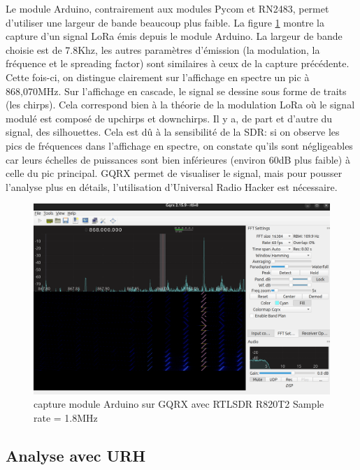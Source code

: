 Le module Arduino, contrairement aux modules Pycom et RN2483, permet d'utiliser une largeur de bande beaucoup plus faible. La figure \ref{term302} montre la capture d'un signal \ac{LoRa} émis depuis le module Arduino. La largeur de bande choisie est de 7.8Khz, les autres paramètres d'émission (la modulation, la fréquence et le spreading factor) sont similaires à ceux de la capture précédente. Cette fois-ci, on distingue clairement sur l'affichage en spectre un pic à 868,070MHz. Sur l'affichage en cascade, le signal se dessine sous forme de traits (les chirps). Cela correspond bien à la théorie de la modulation \ac{LoRa} où le signal modulé est composé de upchirps et downchirps. Il y a, de part et d'autre du signal, des silhouettes. Cela est dû à la sensibilité de la \ac{SDR}: si on observe les pics de fréquences dans l'affichage en spectre, on constate qu'ils sont négligeables car leurs échelles de puissances sont bien inférieures (environ 60dB plus faible) à celle du pic principal. GQRX permet de visualiser le signal, mais pour pousser l'analyse plus en détails, l'utilisation d'Universal Radio Hacker est nécessaire.

\begin{figure}[h]
\centering

\includegraphics[scale=0.17]{images/gqrx5.png}
\caption{capture module Arduino sur GQRX avec RTLSDR R820T2 Sample rate = 1.8MHz}\label{term302}
\end{figure}


\subsection{Analyse avec URH}\label{urh}

